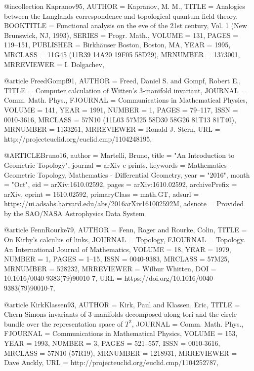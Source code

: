 @incollection {Kapranov95,
    AUTHOR = {Kapranov, M. M.},
     TITLE = {Analogies between the {L}anglands correspondence and
              topological quantum field theory},
 BOOKTITLE = {Functional analysis on the eve of the 21st century, {V}ol. 1
              ({N}ew {B}runswick, {NJ}, 1993)},
    SERIES = {Progr. Math.},
    VOLUME = {131},
     PAGES = {119--151},
 PUBLISHER = {Birkh\"{a}user Boston, Boston, MA},
      YEAR = {1995},
   MRCLASS = {11G45 (11R39 14A20 19F05 58D29)},
  MRNUMBER = {1373001},
MRREVIEWER = {I. Dolgachev},
}

@article {FreedGompf91,
    AUTHOR = {Freed, Daniel S. and Gompf, Robert E.},
     TITLE = {Computer calculation of {W}itten's {$3$}-manifold invariant},
   JOURNAL = {Comm. Math. Phys.},
  FJOURNAL = {Communications in Mathematical Physics},
    VOLUME = {141},
      YEAR = {1991},
    NUMBER = {1},
     PAGES = {79--117},
      ISSN = {0010-3616},
   MRCLASS = {57N10 (11L03 57M25 58D30 58G26 81T13 81T40)},
  MRNUMBER = {1133261},
MRREVIEWER = {Ronald J. Stern},
       URL = {http://projecteuclid.org/euclid.cmp/1104248195},
}

@ARTICLE{Bruno16,
       author = {{Martelli}, Bruno},
        title = "{An Introduction to Geometric Topology}",
      journal = {arXiv e-prints},
     keywords = {Mathematics - Geometric Topology, Mathematics - Differential Geometry},
         year = "2016",
        month = "Oct",
          eid = {arXiv:1610.02592},
        pages = {arXiv:1610.02592},
archivePrefix = {arXiv},
       eprint = {1610.02592},
 primaryClass = {math.GT},
       adsurl = {https://ui.adsabs.harvard.edu/abs/2016arXiv161002592M},
      adsnote = {Provided by the SAO/NASA Astrophysics Data System}
}

@article {FennRourke79,
    AUTHOR = {Fenn, Roger and Rourke, Colin},
     TITLE = {On {K}irby's calculus of links},
   JOURNAL = {Topology},
  FJOURNAL = {Topology. An International Journal of Mathematics},
    VOLUME = {18},
      YEAR = {1979},
    NUMBER = {1},
     PAGES = {1--15},
      ISSN = {0040-9383},
   MRCLASS = {57M25},
  MRNUMBER = {528232},
MRREVIEWER = {Wilbur Whitten},
       DOI = {10.1016/0040-9383(79)90010-7},
       URL = {https://doi.org/10.1016/0040-9383(79)90010-7},
}

@article {KirkKlassen93,
    AUTHOR = {Kirk, Paul and Klassen, Eric},
     TITLE = {Chern-{S}imons invariants of {$3$}-manifolds decomposed along
              tori and the circle bundle over the representation space of
              {$T^2$}},
   JOURNAL = {Comm. Math. Phys.},
  FJOURNAL = {Communications in Mathematical Physics},
    VOLUME = {153},
      YEAR = {1993},
    NUMBER = {3},
     PAGES = {521--557},
      ISSN = {0010-3616},
   MRCLASS = {57N10 (57R19)},
  MRNUMBER = {1218931},
MRREVIEWER = {Dave Auckly},
       URL = {http://projecteuclid.org/euclid.cmp/1104252787},
}

